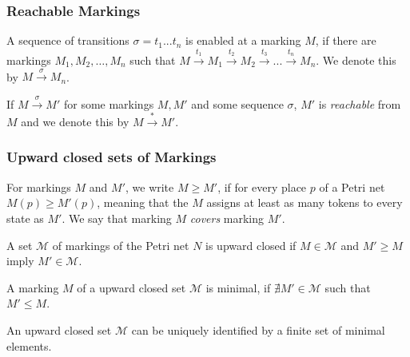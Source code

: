 \subsubsection{Reachable Markings}
A sequence of transitions $\sigma = t_{1}...t_{n}$ is enabled at a marking $M$, if there are markings $M_{1},M_{2},\dots,M_{n}$ such that $M \xrightarrow{t_{1}} M_{1} \xrightarrow{t_{2}} M_{2} \xrightarrow{t_{3}} ... \xrightarrow{t_{n}} M_{n}$. We denote this by $M \xrightarrow{\sigma} M_{n}$. 

If $M \xrightarrow{\sigma} M'$ for some markings $M,M'$ and some sequence $\sigma$, $M'$ is \emph{reachable} from $M$ and we denote this by $M \xrightarrow{*} M'$.


\subsubsection{Upward closed sets of Markings}
For markings $M$ and $M'$, we write $M \ge M'$, if for every place $p$ of a Petri net $M(p) \ge M'(p)$, meaning that the $M$ assigns at least as many tokens to every state as $M'$. We say that marking $M$ \emph{covers} marking $M'$.


A set $\mathcal{M}$ of markings of the Petri net $N$ is upward closed if $M \in \mathcal{M}$ and $M' \ge M$ imply $M' \in \mathcal{M}$.

A marking $M$ of a upward closed set $\mathcal{M}$ is minimal, if $\nexists M' \in \mathcal{M}$ such that $M' \le M$.

An upward closed set $\mathcal{M}$ can be uniquely identified by a finite set of minimal elements. 
